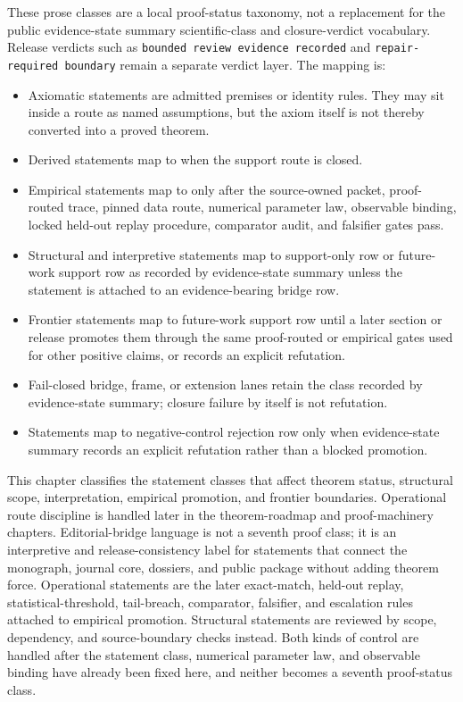 These prose classes are a local proof-status taxonomy, not a replacement for
the public evidence-state summary scientific-class and closure-verdict vocabulary. Release
verdicts such as \texttt{bounded review evidence recorded} and \texttt{repair-required boundary} remain a separate
verdict layer. The mapping is:
\begin{itemize}
\item Axiomatic statements are admitted premises or identity rules. They may
      sit inside a  route as named assumptions, but
      the axiom itself is not thereby converted into a proved theorem.
\item Derived statements map to  when the support
      route is closed.
\item Empirical statements map to  only after the
      source-owned packet, proof-routed trace, pinned data route, numerical
      parameter law, observable binding, locked held-out replay procedure,
      comparator audit, and falsifier gates pass.
\item Structural and interpretive statements map to support-only row or
      future-work support row as recorded by evidence-state summary unless the statement is attached
      to an evidence-bearing bridge row.
\item Frontier statements map to future-work support row until a later section or
      release promotes them through the same proof-routed or empirical gates
      used for other positive claims, or records an explicit refutation.
\item Fail-closed bridge, frame, or extension lanes retain the class recorded
      by evidence-state summary; closure failure by itself is not refutation.
\item Statements map to negative-control rejection row only when evidence-state summary records an explicit
      refutation rather than a blocked promotion.
\end{itemize}
This chapter classifies the statement classes that affect theorem status,
structural scope, interpretation, empirical promotion, and frontier boundaries.
Operational route discipline is handled later in the theorem-roadmap and
proof-machinery chapters.
Editorial-bridge language is not a seventh proof class; it is an interpretive
and release-consistency label for statements that connect the monograph,
journal core, dossiers, and public package without adding theorem force.
Operational statements are the later exact-match, held-out replay,
statistical-threshold, tail-breach, comparator, falsifier, and escalation
rules attached to empirical promotion. Structural statements are reviewed by
scope, dependency, and source-boundary checks instead. Both kinds of control
are handled after the statement class, numerical parameter law, and observable
binding have already been fixed here, and neither becomes a seventh
proof-status class.

